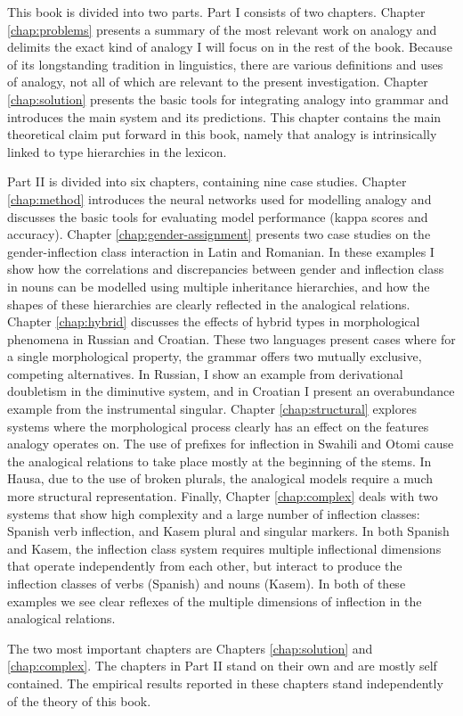 This book is divided into two parts. Part I consists of two chapters. Chapter \ref{chap:problems} presents a summary of the most relevant work on analogy and delimits the exact kind of analogy I will focus on in the rest of the book. Because of its longstanding tradition in linguistics, there are various definitions and uses of analogy, not all of which are relevant to the present investigation. Chapter \ref{chap:solution} presents the basic tools for integrating analogy into grammar and introduces the main system and its predictions. This chapter contains the main theoretical claim put forward in this book, namely that analogy is intrinsically linked to type hierarchies in the lexicon.

Part II is divided into six chapters, containing nine case studies.
Chapter \ref{chap:method} introduces the neural networks used for modelling analogy and discusses the basic tools for evaluating model performance (kappa scores and accuracy).
Chapter \ref{chap:gender-assignment} presents two case studies on the gender-inflection class interaction in Latin and Romanian. In these examples I show how the correlations and discrepancies between gender and inflection class in nouns can be modelled using multiple inheritance hierarchies, and how the shapes of these hierarchies are clearly reflected in the analogical relations.
Chapter \ref{chap:hybrid} discusses the effects of hybrid types in morphological phenomena in Russian and Croatian. These two languages present cases where for a single morphological property, the grammar offers two mutually exclusive, competing alternatives. In Russian, I show an example from derivational doubletism in the diminutive system, and in Croatian I present an overabundance example from the instrumental singular.
Chapter \ref{chap:structural} explores systems where the morphological process clearly has an effect on the features analogy operates on.
The use of prefixes for inflection in Swahili and Otomi cause the analogical relations to take place mostly at the beginning of the stems.
In Hausa, due to the use of broken plurals, the analogical models require a much more structural representation.
Finally, Chapter \ref{chap:complex} deals with two systems that show high complexity and a large number of inflection classes: Spanish verb inflection, and Kasem plural and singular markers.
In both Spanish and Kasem, the inflection class system requires multiple inflectional dimensions that operate independently from each other, but interact to produce the inflection classes of verbs (Spanish) and nouns (Kasem).
In both of these examples we see clear reflexes of the multiple dimensions of inflection in the analogical relations.

The two most important chapters are Chapters \ref{chap:solution} and \ref{chap:complex}. The chapters in Part II stand on their own and are mostly self contained. The empirical results reported in these chapters stand independently of the theory of this book. 

